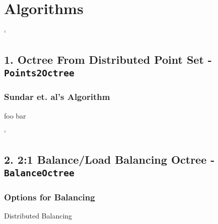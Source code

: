 \section{Algorithms}

`\cprotect\subsection{1. Octree From Distributed Point Set - \verb|Points2Octree|}

\begin{frame}
\frametitle{Sundar et. al's Algorithm}
foo bar
\end{frame}

`\cprotect\subsection{2. 2:1 Balance/Load Balancing Octree - \verb|BalanceOctree|}

\begin{frame}
\frametitle{Options for Balancing}
    Distributed Balancing
\end{frame}
